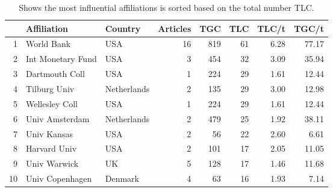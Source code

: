\begin{table}[ht]
\centering
\footnotesize
\begin{tabular}{rllrrrrr}

     \toprule
 & Affiliation &  Country & Articles & TGC & TLC & TLC/t & TGC/t \\ 
 \midrule
1 & World Bank &     USA                & 16 & 819 &  61 & 6.28 & 77.17 \\ 
  2 & Int Monetary Fund &   USA           & 3 & 454 &  32 & 3.09 & 35.94 \\ 
  3 & Dartmouth Coll & USA               & 1 & 224 &  29 & 1.61 & 12.44 \\ 
  4 & Tilburg Univ &     Netherlands             & 2 & 135 &  29 & 3.00 & 12.98 \\ 
  5 & Wellesley Coll &    USA           & 1 & 224 &  29 & 1.61 & 12.44 \\ 
  6 & Univ Amsterdam &   Netherlands              & 2 & 479 &  25 & 1.92 & 38.11 \\ 
  7 & Univ Kansas &     USA             & 2 &  56 &  22 & 2.60 & 6.61 \\ 
  8 & Harvard Univ &   USA           & 2 & 101 &  17 & 2.05 & 11.05 \\ 
  9 & Univ Warwick &     UK           & 5 & 128 &  17 & 1.46 & 11.68 \\ 
  10 & Univ Copenhagen &   Denmark          & 4 &  63 &  16 & 1.93 & 7.14 \\ 
   \bottomrule
\end{tabular}
\caption{Shows the most influential affiliations is sorted based on the total number TLC.} 
\label{tab:Most-Cited-Affliations}
\end{table}

